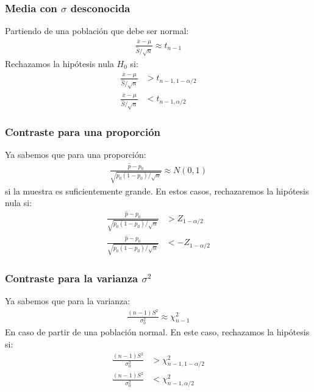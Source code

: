 \documentclass{article}
\begin{document}
\subsubsection{Media con $\sigma $ desconocida}
Partiendo de una población que debe ser normal:
\begin{equation}
    \begin{split}
        \frac{\bar{x}-\mu }{\hat{S} / \sqrt{n}}\approx t_{n-1}
    \end{split}
\end{equation}
Rechazamos la hipótesis nula $H_{0}$ si:
\begin{equation}
    \begin{split}
        \frac{\bar{x}-\mu }{\hat{S} / \sqrt{n}}&>t_{n-1,1-\alpha /2}\\
        \frac{\bar{x}-\mu }{\hat{S} / \sqrt{n}}&<t_{n-1,\alpha /2}
    \end{split}
\end{equation}
\subsubsection{Contraste para una proporción}
Ya sabemos que para una proporción:
\begin{equation}
    \begin{split}
        \frac{\hat{p}-p_{0}}{\sqrt{p_{0}(1-p_{0}) / \sqrt{n}}}\approx N(0,1)
    \end{split}
\end{equation}
si la muestra es suficientemente grande. En estos casos, rechazaremos la hipótesis nula si:
\begin{equation}
    \begin{split}
        \frac{\hat{p}-p_{0}}{\sqrt{p_{0}(1-p_{0}) / \sqrt{n}}} &> Z_{1-\alpha /2}\\
        \frac{\hat{p}-p_{0}}{\sqrt{p_{0}(1-p_{0}) / \sqrt{n}}} &< -Z_{1-\alpha /2}
    \end{split}
\end{equation}
\subsubsection{Contraste para la varianza $\sigma^{2}$}
Ya sabemos que para la varianza:
\begin{equation}
    \begin{split}
        \frac{(n-1)S^{2}}{\sigma_{0}^{2}} \approx \chi^{2}_{n-1}
    \end{split}
\end{equation}
En caso de partir de una población normal. En este caso, rechazamos la hipótesis si:
\begin{equation}
    \begin{split}
        \frac{(n-1)S^{2}}{\sigma_{0}^{2}} &> \chi^{2}_{n-1, 1-\alpha /2}\\
        \frac{(n-1)S^{2}}{\sigma_{0}^{2}} &< \chi^{2}_{n-1, \alpha /2}
    \end{split}
\end{equation}
\end{document}
